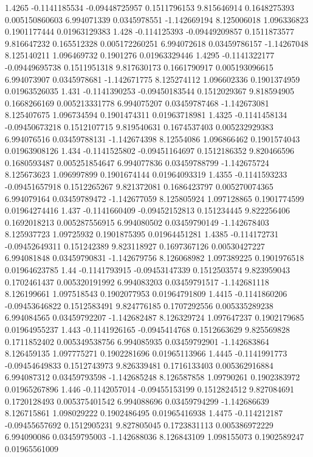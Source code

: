 {1.4265 -0.1141185534 -0.09448725957 0.1511796153 9.815646914 0.1648275393 0.005150860603 6.994071339 0.0345978551 -1.142669194 8.125006018 1.096336823 0.1901177444 0.01963129383
1.428 -0.114125393 -0.09449209857 0.1511873577 9.816647232 0.165512328 0.005172260251 6.994072618 0.03459786157 -1.14267048 8.125140211 1.096469732 0.1901276 0.01963329446
1.4295 -0.1141322177 -0.09449695738 0.1511951318 9.817630173 0.1661790917 0.005193096615 6.994073907 0.0345978681 -1.142671775 8.125274112 1.096602336 0.1901374959 0.01963526035
1.431 -0.1141390253 -0.09450183544 0.1512029367 9.818594905 0.1668266169 0.005213331778 6.994075207 0.03459787468 -1.142673081 8.125407675 1.096734594 0.1901474311 0.01963718981
1.4325 -0.1141458134 -0.09450673218 0.1512107715 9.819540631 0.1674537403 0.005232929383 6.994076516 0.03459788131 -1.142674398 8.12554086 1.096866462 0.1901574043 0.01963908126
1.434 -0.1141525802 -0.09451164697 0.1512186352 9.820466596 0.1680593487 0.005251854647 6.994077836 0.03459788799 -1.142675724 8.125673623 1.096997899 0.1901674144 0.01964093319
1.4355 -0.1141593233 -0.09451657918 0.1512265267 9.821372081 0.1686423797 0.005270074365 6.994079164 0.03459789472 -1.142677059 8.125805924 1.097128865 0.1901774599 0.01964274416
1.437 -0.1141660409 -0.09452152813 0.151234445 9.822256406 0.1692018213 0.005287556915 6.994080502 0.03459790149 -1.142678403 8.125937723 1.09725932 0.1901875395 0.01964451281
1.4385 -0.114172731 -0.09452649311 0.151242389 9.823118927 0.1697367126 0.00530427227 6.994081848 0.03459790831 -1.142679756 8.126068982 1.097389225 0.1901976518 0.01964623785
1.44 -0.1141793915 -0.09453147339 0.1512503574 9.823959043 0.1702461437 0.005320191992 6.994083203 0.03459791517 -1.142681118 8.126199661 1.097518543 0.1902077953 0.01964791809
1.4415 -0.1141860206 -0.09453646822 0.1512583491 9.824776185 0.1707292556 0.005335289238 6.994084565 0.03459792207 -1.142682487 8.126329724 1.097647237 0.1902179685 0.01964955237
1.443 -0.1141926165 -0.0945414768 0.1512663629 9.825569828 0.1711852402 0.005349538756 6.994085935 0.03459792901 -1.142683864 8.126459135 1.097775271 0.1902281696 0.01965113966
1.4445 -0.1141991773 -0.09454649833 0.1512743973 9.826339481 0.1716133403 0.005362916884 6.994087312 0.03459793598 -1.142685248 8.126587858 1.09790261 0.1902383972 0.01965267896
1.446 -0.1142057014 -0.09455153199 0.1512824512 9.827084691 0.1720128493 0.005375401542 6.994088696 0.03459794299 -1.142686639 8.126715861 1.098029222 0.1902486495 0.01965416938
1.4475 -0.114212187 -0.09455657692 0.1512905231 9.827805045 0.1723831113 0.005386972229 6.994090086 0.03459795003 -1.142688036 8.126843109 1.098155073 0.1902589247 0.01965561009
}
